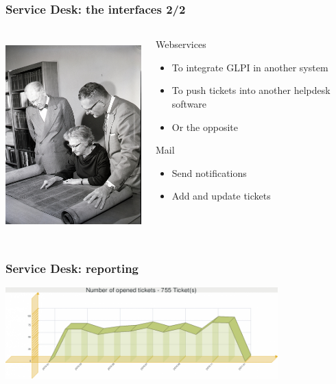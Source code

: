 \documentclass{beamer}
\begin{document}
\begin{frame}

    \frametitle{Service Desk: the interfaces 2/2}


 \begin{columns}
 \begin{column}{0.45\textwidth}
         \includegraphics[height=7.5cm]{./pics/servicedesk3.jpg}
 \end{column}
 \begin{column}{0.45\textwidth}
     \begin{block}{Webservices}
        \begin{itemize}
            \item To integrate GLPI in another system
            \item To push tickets into another helpdesk software
            \item Or the opposite
        \end{itemize}
    \end{block}
\pause
    \begin{block}{Mail}
       \begin{itemize}
            \item Send notifications
            \item Add and update tickets
       \end{itemize}
    \end{block}

 
 \end{column}
\end{columns}

\end{frame}

\begin{frame}

\frametitle{Service Desk: reporting}
\includegraphics[height=3.5cm]{./pics/report1.png}
\end{frame}
\end{document}
